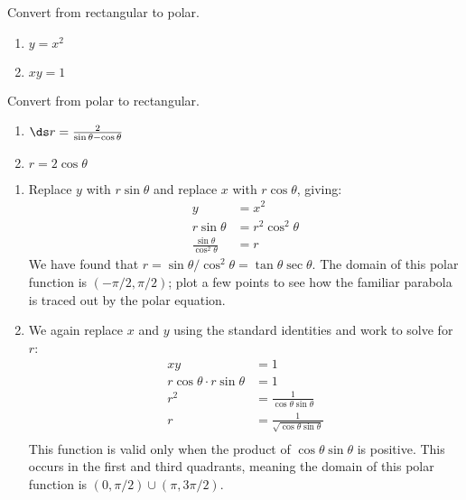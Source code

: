\begin{example}\label{ex_polar6}%
\begin{minipage}[t]{.5\linewidth}
Convert from rectangular to polar.
\begin{enumerate}
	\item $y=x^2$
	\item $xy = 1$
\end{enumerate}
\end{minipage}%
\begin{minipage}[t]{.5\linewidth}
Convert from polar to rectangular.
\begin{enumerate}\addtocounter{enumi}{2}
	\item $\ds r=\frac{2}{\sin \theta-\cos\theta}$
	\item $r=2\cos \theta$
\end{enumerate}
\end{minipage}
\solution
\begin{enumerate}
	\item Replace $y$ with $r\sin\theta$ and replace $x$ with $r\cos\theta$, giving:
	\begin{align*}
	y &=x^2\\
	r\sin\theta &= r^2\cos^2\theta\\
	\frac{\sin\theta}{\cos^2\theta} &= r
	\end{align*}
	We have found that $r=\sin\theta/\cos^2\theta = \tan\theta\sec\theta$. The domain of this polar function is $(-\pi/2,\pi/2)$; plot a few points to see how the familiar parabola is traced out by the polar equation.
	
	\item		We again replace $x$ and $y$ using the standard identities and work to solve for $r$:
	\begin{align*}
	xy &= 1 \\
	r\cos\theta\cdot r\sin\theta & = 1\\
	r^2 & = \frac{1}{\cos\theta\sin\theta}\\
	r & = \frac{1}{\sqrt{\cos\theta\sin\theta}}\\
	\end{align*}
%
%
%
	This function is valid only when the product of $\cos\theta\sin\theta$ is positive. This occurs in the first and third quadrants, meaning the domain of this polar function is $(0,\pi/2) \cup (\pi,3\pi/2)$.
	

\end{enumerate}
\end{example}
